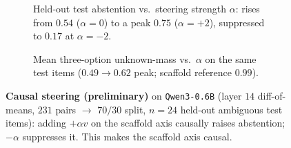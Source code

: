 \begin{figure}[htbp]\centering
  \begin{subfigure}{0.49\linewidth}\centering
    \caption{Held-out test abstention vs.\ steering strength $\alpha$: rises from
      $0.54$ ($\alpha{=}0$) to a peak $0.75$ ($\alpha{=}{+}2$), suppressed to
      $0.17$ at $\alpha{=}{-}2$.}
    \label{fig:steer-abstain}
  \end{subfigure}\hfill
  \begin{subfigure}{0.49\linewidth}\centering
    \caption{Mean three-option unknown-mass vs.\ $\alpha$ on the same test items
      ($0.49 \to 0.62$ peak; scaffold reference $0.99$).}
    \label{fig:steer-unknown}
  \end{subfigure}
  \caption{\textbf{Causal steering (preliminary)} on \texttt{Qwen3-0.6B} (layer
    $14$ diff-of-means, $231$ pairs $\to$ $70/30$ split, $n{=}24$ held-out
    ambiguous test items): adding $+\alpha v$ on the scaffold axis causally raises
    abstention; $-\alpha$ suppresses it. This makes the 
    scaffold axis causal.}
  \label{fig:steer}
\end{figure}
